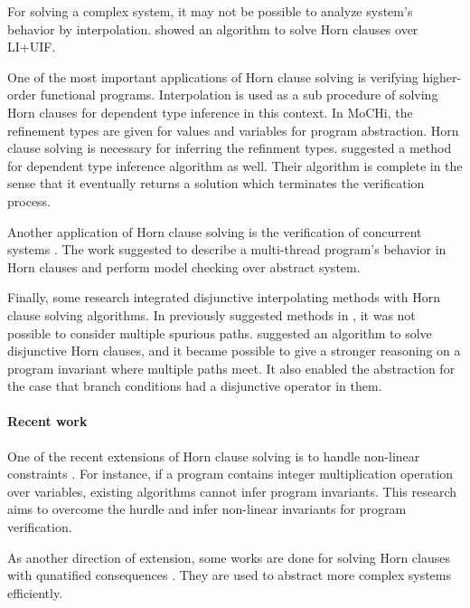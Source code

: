 For solving a complex system, it may not be possible to analyze
system's behavior by interpolation.  \cite{conf/aplas/GuptaPR11}
showed an algorithm to solve Horn clauses over LI+UIF.

One of the most important applications of Horn clause solving is
verifying higher-order functional programs.  Interpolation is used as
a sub procedure of solving Horn clauses for dependent type
inference \cite{conf/ppdp/UnnoK09, conf/pepm/SatoUK13} in this
context. In MoCHi, the refinement types are given for values and
variables for program abstraction.  Horn clause solving is necessary
for inferring the refinment types.  \cite{conf/popl/Terauchi10}
suggested a method for dependent type inference algorithm as
well. Their algorithm is complete in the sense that it eventually
returns a solution which terminates the verification process.

Another application of Horn clause solving is the verification of
concurrent systems \cite{conf/popl/GuptaPR11}. The work suggested to
describe a multi-thread program's behavior in Horn clauses and perform
model checking over abstract system.

Finally, some research integrated disjunctive interpolating methods
with Horn clause solving algorithms.  In previously suggested methods
in \cite{conf/popl/HenzingerJMM04, conf/cav/McMillan06}, it was not
possible to consider multiple spurious
paths.  \cite{conf/cav/RummerHK13} suggested an algorithm to solve
disjunctive Horn clauses, and it became possible to give a stronger
reasoning on a program invariant where multiple paths meet.  It also
enabled the abstraction for the case that branch conditions had a
disjunctive operator in them.

\paragraph{Recent work}

One of the recent extensions of Horn clause solving is to handle
non-linear constraints \cite{conf/cav/DaiXZ13}.  For instance, if a
program contains integer multiplication operation over variables,
existing algorithms cannot infer program invariants.  This research
aims to overcome the hurdle and infer non-linear invariants for
program verification.

As another direction of extension, some works are done for solving
Horn clauses with qunatified consequences \cite{conf/sas/BjornerMR13,
conf/cav/BeyenePR13}.  They are used to abstract more complex systems
efficiently.
